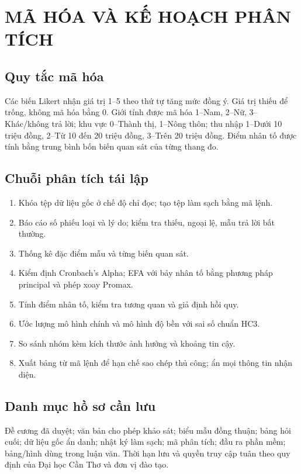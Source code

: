\chapter{MÃ HÓA VÀ KẾ HOẠCH PHÂN TÍCH}
\section*{Quy tắc mã hóa}
Các biến Likert nhận giá trị 1--5 theo thứ tự tăng mức đồng ý. Giá trị thiếu để trống, không mã hóa bằng 0. Giới tính được mã hóa 1--Nam, 2--Nữ, 3--Khác/không trả lời; khu vực 0--Thành thị, 1--Nông thôn; thu nhập 1--Dưới 10 triệu đồng, 2--Từ 10 đến 20 triệu đồng, 3--Trên 20 triệu đồng. Điểm nhân tố được tính bằng trung bình bốn biến quan sát của từng thang đo.

\section*{Chuỗi phân tích tái lập}
\begin{enumerate}
\item Khóa tệp dữ liệu gốc ở chế độ chỉ đọc; tạo tệp làm sạch bằng mã lệnh.
\item Báo cáo số phiếu loại và lý do; kiểm tra thiếu, ngoại lệ, mẫu trả lời bất thường.
\item Thống kê đặc điểm mẫu và từng biến quan sát.
\item Kiểm định Cronbach's Alpha; EFA với bảy nhân tố bằng phương pháp principal và phép xoay Promax.
\item Tính điểm nhân tố, kiểm tra tương quan và giả định hồi quy.
\item Ước lượng mô hình chính và mô hình độ bền với sai số chuẩn HC3.
\item So sánh nhóm kèm kích thước ảnh hưởng và khoảng tin cậy.
\item Xuất bảng từ mã lệnh để hạn chế sao chép thủ công; ẩn mọi thông tin nhận diện.
\end{enumerate}

\section*{Danh mục hồ sơ cần lưu}
Đề cương đã duyệt; văn bản cho phép khảo sát; biểu mẫu đồng thuận; bảng hỏi cuối; dữ liệu gốc ẩn danh; nhật ký làm sạch; mã phân tích; đầu ra phần mềm; bảng/hình dùng trong luận văn. Thời hạn lưu và quyền truy cập tuân theo quy định của Đại học Cần Thơ và đơn vị đào tạo.
